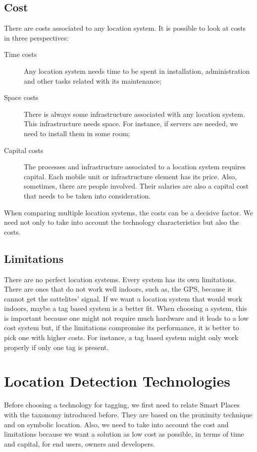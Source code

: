 \subsection{Cost}
\label{sub:background_cost}
There are costs associated to any location system.
It is possible to look at costs in three perspectives:
\begin{description}
  \item[Time costs] Any location system needs time to be spent in installation, administration and other tasks related with its maintenance;
  \item[Space costs] There is always some infrastructure associated with any location system. This infrastructure needs space. For instance, if servers are needed, we need to install them in some room;
  \item[Capital costs] The processes and infrastructure associated to a location system requires capital.
  Each mobile unit or infrastructure element has its price. Also, sometimes, there are people involved. Their salaries are also a capital cost that needs to be taken into consideration.
\end{description}

When comparing multiple location systems, the costs can be a decisive factor. We need not only to take into account the technology characteristics but also the costs.

\subsection{Limitations}
\label{sub:background_limitations}
There are no perfect location systems. Every system has its own limitations.
There are ones that do not work well indoors, such as, the \gls{GPS}, because it cannot get the sattelites' signal.
If we want a location system that would work indoors, maybe a tag based system is a better fit.
When choosing a system, this is important because one might not require much hardware and it leads to a low cost system but, if the limitations compromise its performance, it is better to pick one with higher costs.
For instance, a tag based system might only work properly if only one tag is present.

\section{Location Detection Technologies}
\label{sec:background_technologies}
Before choosing a technology for tagging, we first need to relate Smart Places with the taxonomy introduced before.
They are based on the proximity technique and on symbolic location.
Also, we need to take into account the cost and limitations because we want a solution as low cost as possible, in terms of time and capital, for end users, owners and developers.

